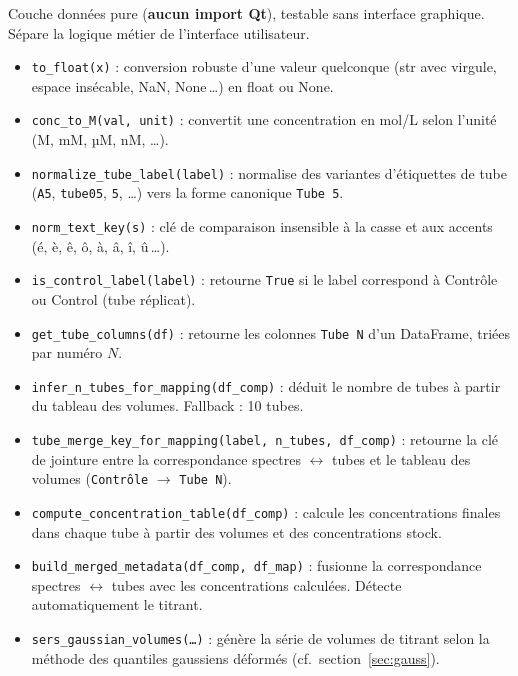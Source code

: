\documentclass[12pt, a4paper]{article}
\begin{document}
Couche données pure (\textbf{aucun import Qt}), testable sans interface
graphique. Sépare la logique métier de l'interface utilisateur.

\begin{itemize}
  \item \texttt{to\_float(x)} : conversion robuste d'une valeur quelconque
        (str avec virgule, espace insécable, NaN, None\,\ldots) en float ou
        None.
  \item \texttt{conc\_to\_M(val, unit)} : convertit une concentration en
        mol/L selon l'unité (M, mM, µM, nM, \ldots).
  \item \texttt{normalize\_tube\_label(label)} : normalise des variantes
        d'étiquettes de tube (\texttt{A5}, \texttt{tube05}, \texttt{5},
        \ldots) vers la forme canonique \texttt{Tube 5}.
  \item \texttt{norm\_text\_key(s)} : clé de comparaison insensible à la
        casse et aux accents (é, è, ê, ô, à, â, î, û\,\ldots).
  \item \texttt{is\_control\_label(label)} : retourne \texttt{True} si le
        label correspond à \og Contrôle\fg{} ou \og Control\fg{} (tube
        réplicat).
  \item \texttt{get\_tube\_columns(df)} : retourne les colonnes \texttt{Tube N}
        d'un DataFrame, triées par numéro $N$.
  \item \texttt{infer\_n\_tubes\_for\_mapping(df\_comp)} : déduit le nombre
        de tubes à partir du tableau des volumes. Fallback : 10 tubes.
  \item \texttt{tube\_merge\_key\_for\_mapping(label, n\_tubes, df\_comp)} :
        retourne la clé de jointure entre la correspondance spectres $\leftrightarrow$
        tubes et le tableau des volumes (\texttt{Contrôle} $\to$ \texttt{Tube N}).
  \item \texttt{compute\_concentration\_table(df\_comp)} : calcule les
        concentrations finales dans chaque tube à partir des volumes et des
        concentrations stock.
  \item \texttt{build\_merged\_metadata(df\_comp, df\_map)} : fusionne la
        correspondance spectres $\leftrightarrow$ tubes avec les concentrations
        calculées. Détecte automatiquement le titrant.
  \item \texttt{sers\_gaussian\_volumes(\ldots)} : génère la série de volumes
        de titrant selon la méthode des quantiles gaussiens déformés
        (cf.\ section~\ref{sec:gauss}).
\end{itemize}
\end{document}
